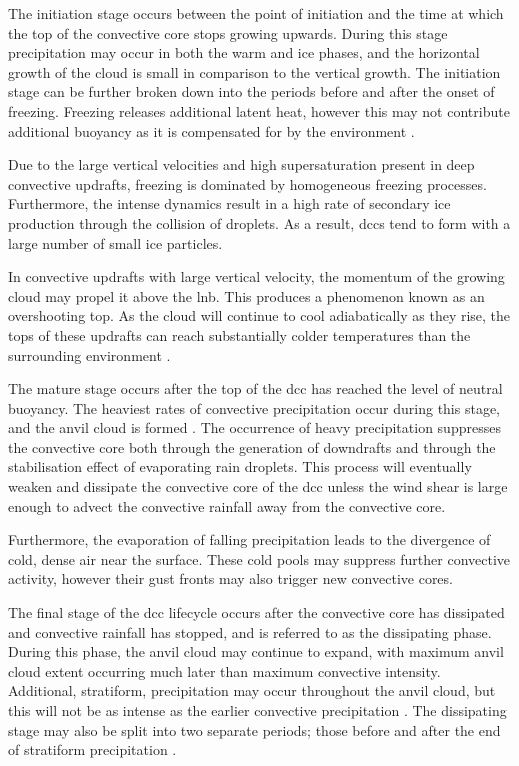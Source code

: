 The initiation stage occurs between the point of initiation and the time at which the top of the convective core stops growing upwards.
During this stage precipitation may occur in both the warm and ice phases, and the horizontal growth of the cloud is small in comparison to the vertical growth.
The initiation stage can be further broken down into the periods before and after the onset of freezing.
Freezing releases additional latent heat, however this may not contribute additional buoyancy as it is compensated for by the environment \citep{seeley_tropical_2016}.

Due to the large vertical velocities and high supersaturation present in deep convective updrafts, freezing is dominated by homogeneous freezing processes.
Furthermore, the intense dynamics result in a high rate of secondary ice production through the collision of droplets.
As a result, \acrshort{dcc}s tend to form with a large number of small ice particles.

In convective updrafts with large vertical velocity, the momentum of the growing cloud may propel it above the \acrshort{lnb}.
This produces a phenomenon known as an overshooting top.
As the cloud will continue to cool adiabatically as they rise, the tops of these updrafts can reach substantially colder temperatures than the surrounding environment \citep{proud_recordlow_2021}.

The mature stage occurs after the top of the \acrshort{dcc} has reached the level of neutral buoyancy.
The heaviest rates of convective precipitation occur during this stage, and the anvil cloud is formed \citep{houze_chapter_2014}.
The occurrence of heavy precipitation suppresses the convective core both through the generation of downdrafts and through the stabilisation effect of evaporating rain droplets.
This process will eventually weaken and dissipate the convective core of the \acrshort{dcc} unless the wind shear is large enough to advect the convective rainfall away from the convective core.

Furthermore, the evaporation of falling precipitation leads to the divergence of cold, dense air near the surface.
These cold pools may suppress further convective activity, however their gust fronts may also trigger new convective cores.

The final stage of the \acrshort{dcc} lifecycle occurs after the convective core has dissipated and convective rainfall has stopped, and is referred to as the dissipating phase.
During this phase, the anvil cloud may continue to expand, with maximum anvil cloud extent occurring much later than maximum convective intensity.
Additional, stratiform, precipitation may occur throughout the anvil cloud, but this will not be as intense as the earlier convective precipitation \citep{houze_chapter_2014}.
The dissipating stage may also be split into two separate periods; those before and after the end of stratiform precipitation \citep{wall_life_2018}.

